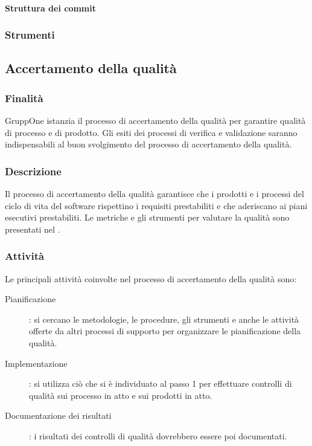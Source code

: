\documentclass[../norme-di-progetto.tex]{subfiles}
\begin{document}
\paragraph{Struttura dei commit}%
\label{par:struttura_dei_commit}

\subsubsection{Strumenti}%
\label{subs:gestione_della_configurazione/strumenti}

\subsection{Accertamento della qualità}%
\label{subs:accertamento_della_qualita}

\subsubsection{Finalità}%
\label{subs:accertamento_della_qualita/finalita}

GruppOne istanzia il processo di accertamento della qualità per garantire qualità di processo e di prodotto.
Gli esiti dei processi di verifica e validazione saranno indispensabili al buon svolgimento del processo di accertamento della qualità.

\subsubsection{Descrizione}%
\label{subs:accertamento_della_qualita/descrizione}

Il processo di accertamento della qualità garantisce che i prodotti e i processi del ciclo di vita del software rispettino i requisiti prestabiliti e che aderiscano ai piani esecutivi prestabiliti. Le metriche e gli strumenti per valutare la qualità sono presentati nel .

\subsubsection{Attività}%
\label{subs:accertamento_della_qualita/attivita}

Le principali attività coinvolte nel processo di accertamento della qualità sono:

\begin{description}
  \item [Pianificazione]: si cercano le metodologie, le procedure, gli strumenti e anche le attività offerte da altri processi di supporto per organizzare le pianificazione della qualità.
  \item [Implementazione]: si utilizza ciò che si è individuato al passo 1 per effettuare controlli di qualità sui processo in atto e sui prodotti in atto.
  \item [Documentazione dei risultati]: i risultati dei controlli di qualità dovrebbero essere poi documentati.
\end{description}
\end{document}
